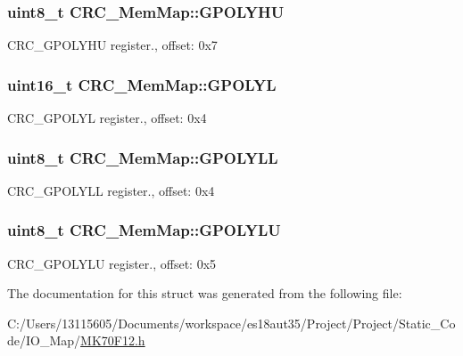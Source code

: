 \subsubsection[{G\+P\+O\+L\+Y\+H\+U}]{\setlength{\rightskip}{0pt plus 5cm}uint8\+\_\+t C\+R\+C\+\_\+\+Mem\+Map\+::\+G\+P\+O\+L\+Y\+H\+U}\label{struct_c_r_c___mem_map_ae7c166006427c82d21b88417313cf511}
C\+R\+C\+\_\+\+G\+P\+O\+L\+Y\+H\+U register., offset\+: 0x7 \hypertarget{struct_c_r_c___mem_map_a4cd3b43b213defbaa07381a32b24af67}{}
\subsubsection[{G\+P\+O\+L\+Y\+L}]{\setlength{\rightskip}{0pt plus 5cm}uint16\+\_\+t C\+R\+C\+\_\+\+Mem\+Map\+::\+G\+P\+O\+L\+Y\+L}\label{struct_c_r_c___mem_map_a4cd3b43b213defbaa07381a32b24af67}
C\+R\+C\+\_\+\+G\+P\+O\+L\+Y\+L register., offset\+: 0x4 \hypertarget{struct_c_r_c___mem_map_afefe4288aecf5a31ca6f6d64317eeb4b}{}
\subsubsection[{G\+P\+O\+L\+Y\+L\+L}]{\setlength{\rightskip}{0pt plus 5cm}uint8\+\_\+t C\+R\+C\+\_\+\+Mem\+Map\+::\+G\+P\+O\+L\+Y\+L\+L}\label{struct_c_r_c___mem_map_afefe4288aecf5a31ca6f6d64317eeb4b}
C\+R\+C\+\_\+\+G\+P\+O\+L\+Y\+L\+L register., offset\+: 0x4 \hypertarget{struct_c_r_c___mem_map_a0ba8bc9ddb8de4ca001f205f32cdd626}{}
\subsubsection[{G\+P\+O\+L\+Y\+L\+U}]{\setlength{\rightskip}{0pt plus 5cm}uint8\+\_\+t C\+R\+C\+\_\+\+Mem\+Map\+::\+G\+P\+O\+L\+Y\+L\+U}\label{struct_c_r_c___mem_map_a0ba8bc9ddb8de4ca001f205f32cdd626}
C\+R\+C\+\_\+\+G\+P\+O\+L\+Y\+L\+U register., offset\+: 0x5 

The documentation for this struct was generated from the following file\+:\begin{DoxyCompactItemize}
\item 
C\+:/\+Users/13115605/\+Documents/workspace/es18aut35/\+Project/\+Project/\+Static\+\_\+\+Code/\+I\+O\+\_\+\+Map/\hyperlink{_m_k70_f12_8h}{M\+K70\+F12.\+h}\end{DoxyCompactItemize}
